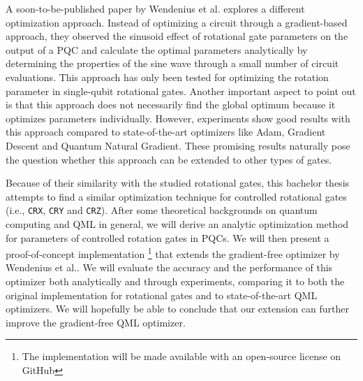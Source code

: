 A soon-to-be-published paper by Wendenius et al.
\cite{wendenius_gradient-free_2023} explores a different optimization approach.
Instead of optimizing a circuit through a gradient-based approach, they observed
the sinusoid effect of rotational gate parameters on the output of a PQC and
calculate the optimal parameters analytically by determining the properties of
the sine wave through a small number of circuit evaluations. 
This approach has only been tested for optimizing the rotation parameter in
single-qubit rotational gates.
Another important aspect to point out is that this approach does not necessarily
find the global optimum because it optimizes parameters individually.
However, experiments show good results with this approach compared to
state-of-the-art optimizers like Adam, Gradient Descent and Quantum Natural
Gradient.
These promising results naturally pose the question whether this approach can be
extended to other types of gates.

Because of their similarity with the studied rotational gates, this bachelor
thesis attempts to find a similar optimization technique for controlled
rotational gates (i.e., \texttt{CRX}, \texttt{CRY} and \texttt{CRZ}).
After some theoretical backgrounds on quantum computing and QML in general, we
will derive an analytic optimization method for parameters of controlled
rotation gates in PQCs.
We will then present a proof-of-concept implementation
\footnote{The implementation will be made available with an open-source license
on GitHub}
that extends the gradient-free optimizer by Wendenius et al..
We will evaluate the accuracy and the performance of this optimizer both
analytically and through experiments, comparing it to both the original
implementation for rotational gates and to state-of-the-art QML optimizers.
We will hopefully be able to conclude that our extension can further improve the
gradient-free QML optimizer.
